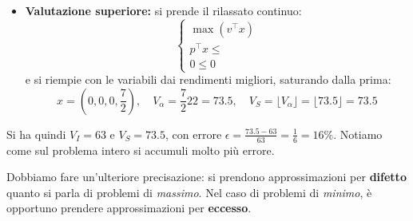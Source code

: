 \documentclass[a4paper,11pt]{article}
\begin{document}
\begin{itemize}
\begin{itemize}
		\item \textbf{Valutazione superiore:} si prende il rilassato continuo:
			\[
				\begin{cases}
					\max (v^\intercal x) \\ 
					p^\intercal x \leq \\ 
					0 \leq 0
				\end{cases}
			\]
			e si riempie con le variabili dai rendimenti migliori, saturando dalla prima:
			$$ x = \left( 0, 0, 0, \frac{7}{2} \right), \quad V_\alpha = \frac{7}{2} 22 = 73.5, \quad V_S = \lfloor V_\alpha \rfloor = \lfloor 73.5 \rfloor = 73.5 $$
	\end{itemize}
	Si ha quindi $V_I = 63$ e $V_S = 73.5$, con errore $\epsilon = \frac{73.5 - 63}{63} = \frac{1}{6} = 16\%$.
	Notiamo come sul problema intero si accumuli molto più errore.
\end{itemize}

Dobbiamo fare un'ulteriore precisazione: si prendono approssimazioni per \textbf{difetto} quanto si parla di problemi di \textit{massimo}.
Nel caso di problemi di \textit{minimo}, è opportuno prendere approssimazioni per \textbf{eccesso}.
\end{document}
